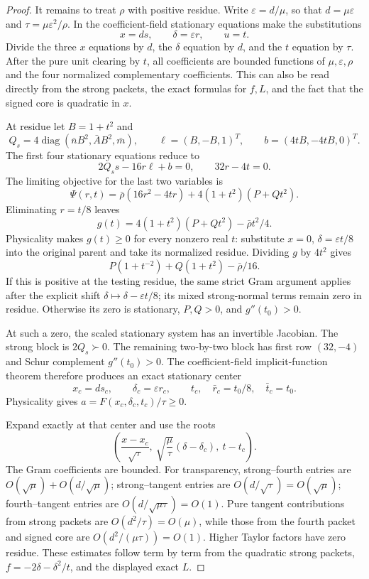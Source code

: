 \begin{proof}
It remains to treat $\rho$ with positive residue. Write $\varepsilon=d/\mu$, so that $d=\mu\varepsilon$ and $\tau=\mu\varepsilon^2/\rho$. In the coefficient-field stationary equations make the substitutions
\[
x=d s,\qquad \delta=\varepsilon r,\qquad u=t.
\]
Divide the three $x$ equations by $d$, the $\delta$ equation by $d$, and the $t$ equation by $\tau$. After the pure unit clearing by $t$, all coefficients are bounded functions of $\mu,\varepsilon,\rho$ and the four normalized complementary coefficients. This can also be read directly from the strong packets, the exact formulas for $f,L$, and the fact that the signed core is quadratic in $x$.

At residue let $B=1+t^2$ and
\[
Q_s=4\operatorname{diag}(\bar n B^2,\bar A B^2,\bar m),\qquad
\ell=(B,-B,1)^T,\qquad b=(4tB,-4tB,0)^T.
\]
The first four stationary equations reduce to
\[
2Q_s s-16r\ell+b=0,\qquad 32r-4t=0.
\]
The limiting objective for the last two variables is
\[
\Psi(r,t)=\bar\rho(16r^2-4tr)+4(1+t^2)(P+Qt^2).
\]
Eliminating $r=t/8$ leaves
\[
g(t)=4(1+t^2)(P+Qt^2)-\bar\rho t^2/4.
\]
Physicality makes $g(t)\ge0$ for every nonzero real $t$: substitute $x=0$, $\delta=\varepsilon t/8$ into the original parent and take its normalized residue. Dividing $g$ by $4t^2$ gives
\[
P(1+t^{-2})+Q(1+t^2)-\bar\rho/16.
\]
If this is positive at the testing residue, the same strict Gram argument applies after the explicit shift $\delta\mapsto\delta-\varepsilon t/8$; its mixed strong-normal terms remain zero in residue. Otherwise its zero is stationary, $P,Q>0$, and $g''(t_0)>0$.

At such a zero, the scaled stationary system has an invertible Jacobian. The strong block is $2Q_s\succ0$. The remaining two-by-two block has first row $(32,-4)$ and Schur complement $g''(t_0)>0$. The coefficient-field implicit-function theorem therefore produces an exact stationary center
\[
x_c=d s_c,\qquad\delta_c=\varepsilon r_c,\qquad t_c,
\quad \bar r_c=t_0/8,\quad\bar t_c=t_0.
\]
Physicality gives $a=F(x_c,\delta_c,t_c)/\tau\ge0$.

Expand exactly at that center and use the roots
\[
\left(\frac{x-x_c}{\sqrt\tau},\
\sqrt{\frac\mu\tau}(\delta-\delta_c),\ t-t_c\right).
\]
The Gram coefficients are bounded. For transparency, strong--fourth entries are $O(\sqrt\mu)+O(d/\sqrt\mu)$; strong--tangent entries are $O(d/\sqrt\tau)=O(\sqrt\mu)$; fourth--tangent entries are $O(d/\sqrt{\mu\tau})=O(1)$. Pure tangent contributions from strong packets are $O(d^2/\tau)=O(\mu)$, while those from the fourth packet and signed core are $O(d^2/(\mu\tau))=O(1)$. Higher Taylor factors have zero residue. These estimates follow term by term from the quadratic strong packets, $f=-2\delta-\delta^2/t$, and the displayed exact $L$.


\end{proof}
